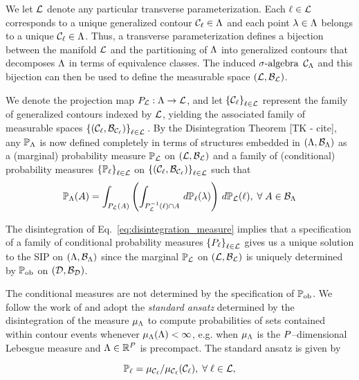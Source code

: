 We let $\mathcal{L}$ denote any particular transverse parameterization.
Each $\ell\in\mathcal{L}$ corresponds to a unique generalized contour $\mathcal{C}_\ell \in {\Lambda}$ and each point $\lambda\in{\Lambda}$ belongs to a unique $\mathcal{C}_\ell\in{\Lambda}$.
Thus, a transverse parameterization defines a bijection between the manifold $\mathcal{L}$ and the partitioning of ${\Lambda}$ into generalized contours that decomposes ${\Lambda}$ in terms of equivalence classes.
The induced $\sigma\text{-algebra}$ $\mathcal{C}_{{\Lambda}}$ and this bijection can then be used to define the measurable space $(\mathcal{L}, \mathcal{B}_{\mathcal{L}})$.

We denote the projection map $P_{\mathcal{L}} : {\Lambda} \to \mathcal{L}$, and let $\left\{\mathcal{C}_\ell\right\}_{\ell\in\mathcal{L}}$ represent the family of generalized contours indexed by $\mathcal{L}$, yielding the associated family of measurable spaces $\left\{\left ( \mathcal{C}_\ell, \mathcal{B}_{\mathcal{C}_\ell} \right )\right\}_{\ell\in\mathcal{L}}{}$.
By the Disintegration Theorem [TK - cite], any $\mathbb{P}_{\Lambda}$ is now defined completely in terms of structures embedded in $({\Lambda}, \mathcal{B}_{{\Lambda}})$ as a (marginal) probability measure $\mathbb{P}_{\mathcal{L}}$ on $(\mathcal{L}, \mathcal{B}_{\mathcal{L}})$ and a family of (conditional) probability measures $\left\{\mathbb{P}_\ell\right\}_{\ell\in\mathcal{L}}$ on $\left\{\left ( \mathcal{C}_\ell, \mathcal{B}_{\mathcal{C}_\ell} \right )\right\}_{\ell\in\mathcal{L}}$ such that
\begin{equation}\label{eq:disintegration_measure}
\mathbb{P}_{\Lambda} (A) = \int_{P_{\mathcal{L}}(A)} \left ( \int_{P_{\mathcal{L}}^{-1} (\ell) \cap A}\, d\mathbb{P}_\ell(\lambda) \right )\, d\mathbb{P}_{\mathcal{L}} (\ell), \; \forall \; A \in \mathcal{B}_{{\Lambda}}
\end{equation}

The disintegration of Eq.~\eqref{eq:disintegration_measure} implies that a specification of a family of conditional probability measures $\left\{P_\ell\right\}_{\ell\in\mathcal{L}}$ gives us a unique solution to the SIP on ${({\Lambda}, \mathcal{B}_{{\Lambda}})}$ since the marginal $\mathbb{P}_{\mathcal{L}}$ on ${(\mathcal{L}, \mathcal{B}_{\mathcal{L}})}$ is uniquely determined by $\operatorname*{\mathbb{P}_{ob}}$ on ${(\mathcal{D}, \mathcal{B}_{\mathcal{D}})}$.

The conditional measures are not determined by the specification of $\operatorname*{\mathbb{P}_{ob}}$.
We follow the work of \cite{BET+14} and adopt the \emph{standard ansatz} determined by the disintegration of the measure $\mu_{{\Lambda}}$ to compute probabilities of sets contained within contour events whenever $\mu_{{\Lambda}}({\Lambda}) < \infty$, e.g. when $\mu_{{\Lambda}}$ is the $P$--dimensional Lebesgue measure and ${\Lambda} \in \mathbb{R}^P$ is precompact.
The standard ansatz is given by

\begin{equation}\label{eq:standard_ansatz}
\mathbb{P}_\ell = \mu_{\mathcal{C}_\ell} / \mu_{\mathcal{C}_\ell}(\mathcal{C}_\ell), \; \forall \; \ell \in \mathcal{L},
\end{equation}

